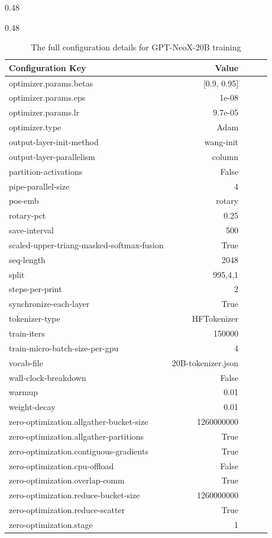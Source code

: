 \documentclass{article}
\newcommand{\model}{GPT-NeoX-20B}
\begin{document}
\begin{table}[ht!]
\begin{subtable}[h]{0.48\textwidth}
\end{subtable}
\begin{subtable}[h]{0.48\textwidth}
\begin{tabular}{lrrcc}
\hline
Configuration Key                               & Value \\
\hline
    optimizer.params.betas & [0.9, 0.95] \\
    optimizer.params.eps & 1e-08 \\
    optimizer.params.lr & 9.7e-05 \\
    optimizer.type & Adam \\
    output-layer-init-method & wang-init \\
    output-layer-parallelism & column \\
    partition-activations & False \\
    pipe-parallel-size & 4 \\
    pos-emb & rotary \\
    rotary-pct & 0.25 \\
    save-interval & 500 \\
    scaled-upper-triang-masked-softmax-fusion & True \\
    seq-length & 2048 \\
    split & 995,4,1 \\
    steps-per-print & 2 \\
    synchronize-each-layer & True \\
    tokenizer-type & HFTokenizer \\
    train-iters & 150000 \\
    train-micro-batch-size-per-gpu & 4 \\
    vocab-file & 20B-tokenizer.json \\
    wall-clock-breakdown & False \\
    warmup & 0.01 \\
    weight-decay & 0.01 \\
    zero-optimization.allgather-bucket-size & 1260000000 \\
    zero-optimization.allgather-partitions & True \\
    zero-optimization.contiguous-gradients & True \\
    zero-optimization.cpu-offload & False \\
    zero-optimization.overlap-comm & True \\
    zero-optimization.reduce-bucket-size & 1260000000 \\
    zero-optimization.reduce-scatter & True \\
    zero-optimization.stage & 1 \\
    \end{tabular}
\end{subtable}
\caption{The full configuration details for \model{} training}
\label{tab:config}
\end{table}
\end{document}
